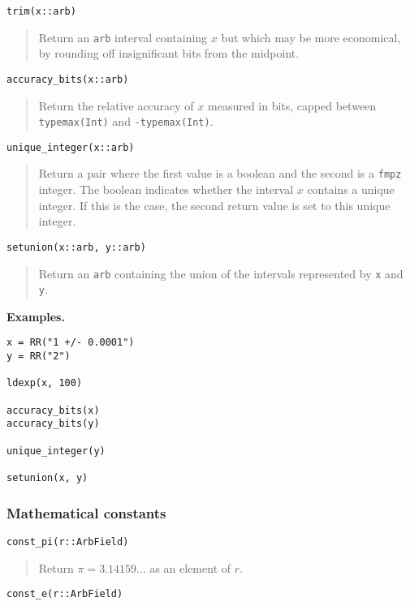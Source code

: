 \documentclass[a4paper,10pt]{article}
\newcommand{\code}{\lstinline}
\newcommand{\desc}[1]{\vspace{-3mm}\begin{quote}#1\end{quote}}
\begin{document}
{{\begin{lstlisting}
trim(x::arb)
\end{lstlisting}

\desc{Return an \code{arb} interval containing $x$ but which may be more economical,
by rounding off insignificant bits from the midpoint.}

\begin{lstlisting}
accuracy_bits(x::arb)
\end{lstlisting}

\desc{Return the relative accuracy of $x$ measured in bits, capped
between \code{typemax(Int)} and \code{-typemax(Int)}.}

\begin{lstlisting}
unique_integer(x::arb)
\end{lstlisting}

\desc{Return a pair where the first value is a boolean and the second
is a \code{fmpz} integer. The boolean indicates whether the interval $x$
contains a unique integer. If this is the case, the second return
value is set to this unique integer.}

\begin{lstlisting}
setunion(x::arb, y::arb)
\end{lstlisting}

\desc{Return an \code{arb} containing the union of the intervals
represented by \code{x} and \code{y}.}

\textbf{Examples.}

\begin{lstlisting}
x = RR("1 +/- 0.0001")
y = RR("2")

ldexp(x, 100)

accuracy_bits(x)
accuracy_bits(y)

unique_integer(y)

setunion(x, y)
\end{lstlisting}

\subsubsection{Mathematical constants}

\begin{lstlisting}
const_pi(r::ArbField)
\end{lstlisting}

\desc{Return $\pi = 3.14159\ldots$ as an element of $r$.}

\begin{lstlisting}
const_e(r::ArbField)
\end{lstlisting}

}}
\end{document}
